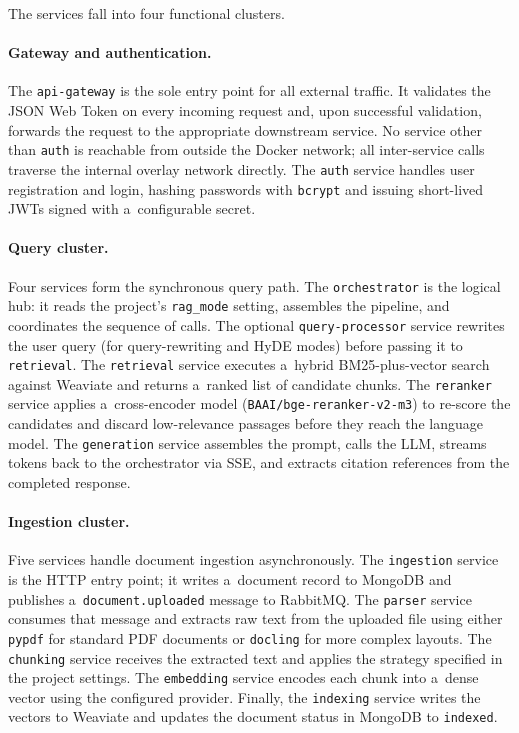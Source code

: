 The services fall into four functional clusters.

\paragraph{Gateway and authentication.}
The \texttt{api-gateway} is the sole entry point for all external traffic.
It validates the JSON Web Token on every incoming request and, upon successful
validation, forwards the request to the appropriate downstream service.
No service other than \texttt{auth} is reachable from outside the Docker network;
all inter-service calls traverse the internal overlay network directly.
The \texttt{auth} service handles user registration and login, hashing passwords
with \texttt{bcrypt} and issuing short-lived JWTs signed with a~configurable secret.

\paragraph{Query cluster.}
Four services form the synchronous query path.  The \texttt{orchestrator}
is the logical hub: it reads the project's \texttt{rag\_mode} setting,
assembles the pipeline, and coordinates the sequence of calls.  The optional
\texttt{query-processor} service rewrites the user query (for query-rewriting
and HyDE modes) before passing it to \texttt{retrieval}.  The
\texttt{retrieval} service executes a~hybrid BM25-plus-vector search against
Weaviate and returns a~ranked list of candidate chunks.  The \texttt{reranker}
service applies a~cross-encoder model (\texttt{BAAI/bge-reranker-v2-m3}) to
re-score the candidates and discard low-relevance passages before they reach
the language model.  The \texttt{generation} service assembles the prompt,
calls the LLM, streams tokens back to the orchestrator via SSE, and extracts
citation references from the completed response.

\paragraph{Ingestion cluster.}
Five services handle document ingestion asynchronously.  The
\texttt{ingestion} service is the HTTP entry point; it writes a~document
record to MongoDB and publishes a~\texttt{document.uploaded} message to
RabbitMQ.  The \texttt{parser} service consumes that message and extracts
raw text from the uploaded file using either \texttt{pypdf} for standard
PDF documents or \texttt{docling} for more complex layouts.  The
\texttt{chunking} service receives the extracted text and applies the
strategy specified in the project settings.  The \texttt{embedding} service
encodes each chunk into a~dense vector using the configured provider.
Finally, the \texttt{indexing} service writes the vectors to Weaviate and
updates the document status in MongoDB to \texttt{indexed}.

